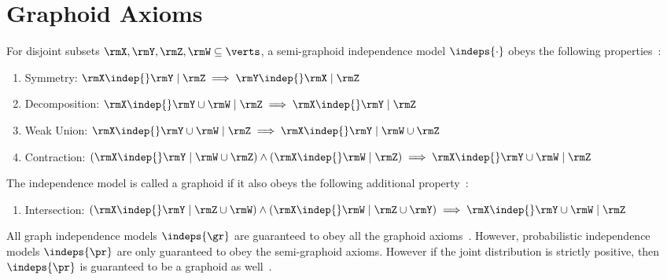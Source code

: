 \section{Graphoid Axioms}\label{apx:graphoid}
\begin{definition}\label{def:graphoid}
  For disjoint subsets $\rmX,\rmY,\rmZ,\rmW\subseteq\verts$, a
  semi-graphoid independence model $\indeps{\cdot}$ obeys the following
  properties~\citep{dawid1979,pearl1987}:
  \begin{enumerate}
  \item Symmetry:
    $\rmX \indep{} \rmY \mid \rmZ \implies \rmY\indep{}\rmX\mid\rmZ$
  \item Decomposition:
    $\rmX \indep{} \rmY \cup \rmW \mid \rmZ \implies
    \rmX\indep{}\rmY\mid\rmZ$
  \item Weak Union:
    $\rmX\indep{}\rmY\cup\rmW\mid\rmZ \implies \rmX\indep{}\rmY \mid
    \rmW\cup\rmZ$
  \item Contraction:
    $(\rmX\indep{}\rmY \mid \rmW\cup\rmZ) \wedge
    (\rmX\indep{}\rmW\mid\rmZ)\implies \rmX\indep{}\rmY\cup\rmW\mid\rmZ$
  \end{enumerate}
  The independence model is called a graphoid if it also obeys the
  following additional property~\citep{pearl1985}:
  \begin{enumerate}[resume]
  \item Intersection:
    $(\rmX \indep{} \rmY \mid \rmZ \cup \rmW) \wedge
    (\rmX \indep{} \rmW \mid \rmZ \cup \rmY)
    \implies \rmX \indep{} \rmY \cup \rmW \mid
    \rmZ$
  \end{enumerate}
  All graph independence models $\indeps{\gr}$ are guaranteed to
  obey all the graphoid axioms~\citep{lauritzen2018}. However,
  probabilistic independence models $\indeps{\pr}$ are only guaranteed to
  obey the semi-graphoid axioms. However if the joint distribution is
  strictly positive, then $\indeps{\pr}$ is guaranteed to be a
  graphoid as well~\citep{pearl1988,pearl1989}.
\end{definition}

